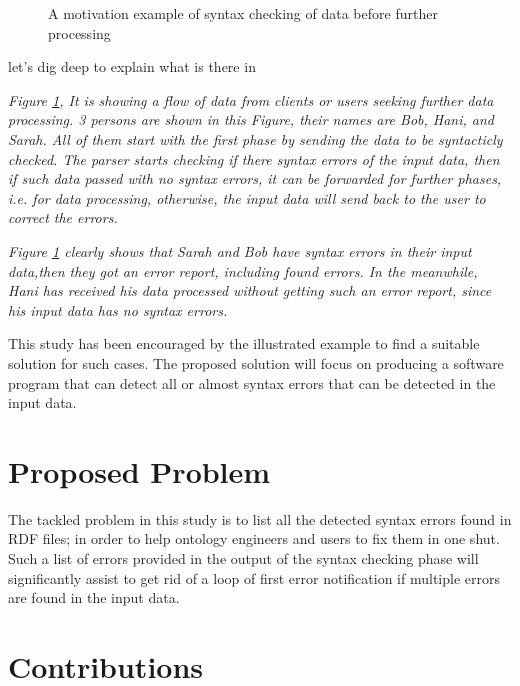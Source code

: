 {\begin{figure}[ht]
\begin{center}
			\caption{A motivation example of syntax checking of data before further processing}
			\label{Fig:Motivation}
		\end{center}
	\end{figure}
	\vspace{10mm} %
	
	let's dig deep to explain what is there in  {\it Figure \ref{Fig:Motivation}, It is showing a flow of data from clients or users seeking further data processing. 3 persons are shown in this Figure, their names are Bob, Hani, and Sarah. All of them start with the first phase by sending the data to be syntacticly checked. The parser starts checking if there syntax errors of the input data, then if such data passed with no syntax errors, it can be forwarded for further phases, i.e. for data processing, otherwise, the input data will send back to the user to correct the errors. {\it Figure \ref{Fig:Motivation} clearly shows that Sarah and Bob have syntax errors in their input data,then they got an error report, including found errors. In the meanwhile, Hani has received his data processed without getting such an error report, since his input data has no syntax errors. 
			\vspace{5mm} %
			\par
			This study has been encouraged by the illustrated example to find a suitable solution for such cases. The proposed solution will focus on producing a software program that can detect all or almost syntax errors that can be detected in the input data. 

\section{Proposed Problem } 	
The tackled problem in this study is to list all the detected syntax errors found in RDF files; in order to help ontology engineers and users to fix them in one shut. Such a list of errors provided in the output of the syntax checking phase will significantly assist to get rid of a loop of first error notification if multiple errors are found in the input data.  

\section {Contributions}

}}}
